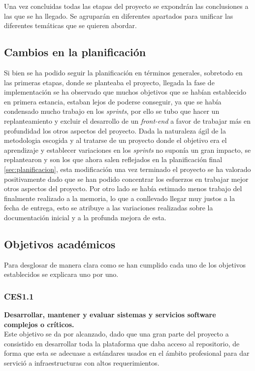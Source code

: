 Una vez concluidas todas las etapas del proyecto se expondrán las conclusiones a las que se ha llegado. Se agruparán en diferentes apartados para unificar las diferentes temáticas que se quieren abordar.

\subsection{Cambios en la planificación}
Si bien se ha podido seguir la planificación en términos generales,
sobretodo en las primeras etapas, donde se planteaba el proyecto, llegada la fase de implementación se ha observado que muchos objetivos que se habían establecido en primera estancia, estaban lejos de poderse conseguir, ya que se había condensado mucho trabajo en los \textit{sprints}, por ello se tubo que hacer un replanteamiento y excluir el desarrollo de un \textit{front-end} a favor de trabajar más en profundidad los otros aspectos del proyecto. Dada la naturaleza ágil de la metodologia escogida y al tratarse de un proyecto donde el objetivo era el aprendizaje y establecer variaciones en los \textit{sprints} no suponía un gran impacto, se replantearon y son los que ahora salen reflejados en la planificación final \ref{sec:planificacion}, esta modificación una vez terminado el proyecto se ha valorado positivamente dado que se han podido concentrar los esfuerzos en trabajar mejor otros aspectos del proyecto. Por otro lado se había estimado menos trabajo del finalmente realizado a la memoria, lo que a conllevado llegar muy justos a la fecha de entrega, esto se atribuye a las variaciones realizadas sobre la documentación inicial y a la profunda mejora de esta.

\subsection{Objetivos académicos}
Para desglosar de manera clara como se han cumplido cada uno de los objetivos establecidos se explicara uno por uno.
\subsubsection{CES1.1}
\textbf{Desarrollar, mantener y evaluar sistemas y servicios software complejos o críticos.}\\
Este objetivo se da por alcanzado, dado que una gran parte del proyecto a consistido en desarrollar toda la plataforma que daba acceso al repositorio, de forma que esta se adecuase a estándares usados en el ámbito profesional para dar servició a infraestructuras con altos requerimientos.  

